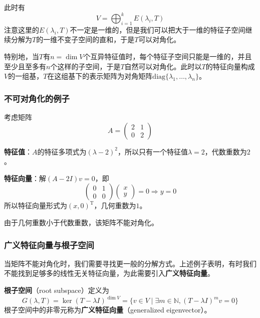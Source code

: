此时有
\[
V = \bigoplus_{i=1}^{k} E(\lambda_i, T)
\]
注意这里的$E(\lambda_i, T)$不一定是一维的，但是我们可以把大于一维的特征子空间继续分解为$T$的一维不变子空间的直和，于是$T$可以对角化。

特别地，当$T$有$n = \dim V$个互异特征值时，每个特征子空间只能是一维的，并且至少且至多有$n$个这样的子空间，于是$T$自然可以对角化。此时以$T$的特征向量构成$V$的一组基，$T$在这组基下的表示矩阵为对角矩阵$\text{diag}\{\lambda_1, \ldots, \lambda_n\}$。

\subsubsection{不可对角化的例子}

\begin{example}
考虑矩阵
\[
A = \begin{pmatrix} 2 & 1 \\ 0 & 2 \end{pmatrix}
\]

\textbf{特征值}：$A$的特征多项式为$(\lambda - 2)^2$，所以只有一个特征值$\lambda = 2$，代数重数为$2$。

\textbf{特征向量}：解$(A - 2I)v = 0$，即
\[
\begin{pmatrix} 0 & 1 \\ 0 & 0 \end{pmatrix}\begin{pmatrix} x \\ y \end{pmatrix} = 0 \Rightarrow y = 0
\]
所以特征向量形式为$(x, 0)^{\mathrm{T}}$，几何重数为$1$。

由于几何重数小于代数重数，该矩阵不能对角化。
\end{example}


\subsubsection{广义特征向量与根子空间}

当矩阵不能对角化时，我们需要寻找更一般的分解方式。上述例子表明，有时我们不能找到足够多的线性无关特征向量，为此需要引入\textbf{广义特征向量}。

\begin{definition}[根子空间]
\textbf{根子空间}（root subspace）定义为
\[
G(\lambda, T) = \ker(T - \lambda I)^{\dim V} = \{v \in V \mid \exists m \in \mathbb{N}, (T - \lambda I)^m v = 0\}
\]
根子空间中的非零元称为\textbf{广义特征向量}（generalized eigenvector）。
\end{definition}


